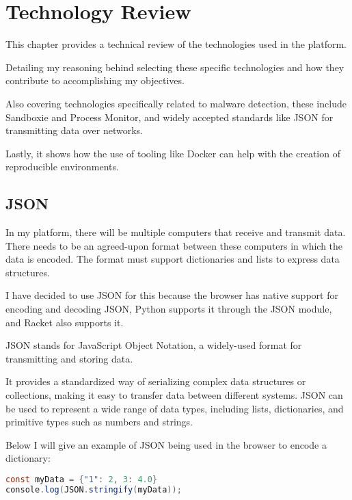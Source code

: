 \chapter{Technology Review}


This chapter provides a technical review of the technologies used in the platform.

Detailing my reasoning behind selecting these specific technologies
and how they contribute to accomplishing my objectives.

Also covering technologies specifically related to malware detection,
these include Sandboxie and Process Monitor,
and widely accepted standards like JSON for transmitting data over networks.

Lastly, it shows how the use of tooling like Docker
can help with the creation of reproducible environments.

\section{JSON}
In my platform, there will be multiple computers that receive and transmit data.
There needs to be an agreed-upon format between these computers in which the data is encoded.
The format must support dictionaries and lists to express data structures.

I have decided to use JSON for this because the browser has
native support for encoding and decoding JSON,
Python supports it through the JSON module, and Racket also supports it.

JSON stands for JavaScript Object Notation,
a widely-used format for transmitting and storing data.

It provides a standardized way of serializing complex data structures or collections,
making it easy to transfer data between different systems.
JSON can be used to represent a wide range of data types,
including lists, dictionaries, and primitive types such as numbers and strings. \cite{ECMA-404}

Below I will give an example of JSON being used in the browser to encode a dictionary:

\begin{lstlisting}[language=Java]
const myData = {"1": 2, 3: 4.0}
console.log(JSON.stringify(myData));
\end{lstlisting}

